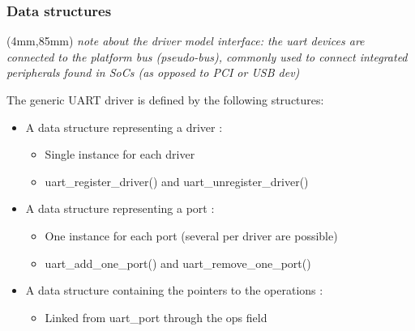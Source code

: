 \documentclass[xcolor=dvipsnames,compress]{beamer}
\newenvironment{reference}[2]{%
  \begin{textblock*}{\textwidth}(#1,#2) 
      \tiny\it\bgroup\color{blue}}{\egroup\end{textblock*}}
\begin{document}
\begin{frame}[fragile]
\frametitle{Data structures}
\begin{reference}{4mm}{85mm}
note about the driver model interface: the uart devices are connected to the platform bus (pseudo-bus), 
commonly used to connect integrated peripherals found in SoCs (as opposed to PCI or USB dev) 
\end{reference} 
The generic UART driver is defined by the following structures:
\begin{itemize}
    \item A data structure representing a driver : 
    \begin{itemize}
      \item Single instance for each driver
      \item uart\_register\_driver() and uart\_unregister\_driver()
    \end{itemize}
    \item A data structure representing a port : 
    \begin{itemize}
      \item One instance for each port (several per driver are possible)
      \item uart\_add\_one\_port() and uart\_remove\_one\_port()
    \end{itemize}
    \item A data structure containing the pointers to the operations : 
    \begin{itemize}
      \item Linked from uart\_port through the ops field
    \end{itemize}
\end{itemize}
\end{frame}
\end{document}

